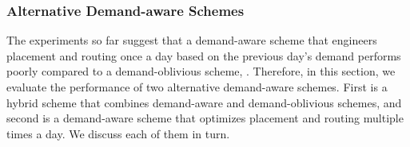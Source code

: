 





\subsubsection{Alternative Demand-aware Schemes}
The experiments so far  suggest that a demand-aware scheme that engineers placement and routing once a day based on the previous day's demand performs poorly compared to a demand-oblivious scheme, \invlru. Therefore, in this section, we evaluate the performance of two alternative demand-aware schemes. First is a hybrid scheme that combines demand-aware  and demand-oblivious schemes, and second is a demand-aware scheme that optimizes placement and routing multiple times a day. We discuss each of them in turn.


 



